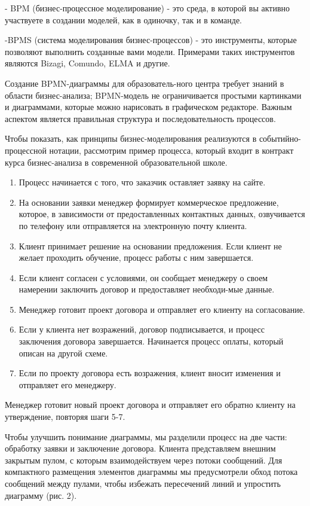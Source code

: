 \begin{multicols}{2}
- BPM (бизнес-процессное моделирование) - это среда, в которой вы
активно участвуете в создании моделей, как в одиночку, так и в команде.

-BPMS (система моделирования бизнес-процессов) - это инструменты,
которые позволяют выполнить созданные вами модели. Примерами таких
инструментов являются Bizagi, Comundo, ELMA и другие.

Создание BPMN-диаграммы для образователь-ного центра требует знаний в
области бизнес-анализа; BPMN-модель не ограничивается простыми
картинками и диаграммами, которые можно нарисовать в графическом
редакторе. Важным аспектом является правильная структура и
последовательность процессов.

Чтобы показать, как принципы бизнес-моделирования реализуются в
событийно-процессной нотации, рассмотрим пример процесса, который входит
в контракт курса бизнес-анализа в современной образовательной школе.

\begin{enumerate}
\def\labelenumi{\arabic{enumi}.}
\setlength{\itemindent}{1cm}
\item
  Процесс начинается с того, что заказчик оставляет заявку на сайте.
\item
  На основании заявки менеджер формирует коммерческое предложение,
  которое, в зависимости от предоставленных контактных данных,
  озвучивается по телефону или отправляется на электронную почту
  клиента.
\item
  Клиент принимает решение на основании предложения. Если клиент не
  желает проходить обучение, процесс работы с ним завершается.
\item
  Если клиент согласен с условиями, он сообщает менеджеру о своем
  намерении заключить договор и предоставляет необходи-мые данные.
\item
  Менеджер готовит проект договора и отправляет его клиенту на
  согласование.
\item
  Если у клиента нет возражений, договор подписывается, и процесс
  заключения договора завершается. Начинается процесс оплаты, который
  описан на другой схеме.
\item
  Если по проекту договора есть возражения, клиент вносит изменения и
  отправляет его менеджеру.
\end{enumerate}

Менеджер готовит новый проект договора и отправляет его обратно клиенту
на утверждение, повторяя шаги 5-7.

Чтобы улучшить понимание диаграммы, мы разделили процесс на две части:
обработку заявки и заключение договора. Клиента представляем внешним
закрытым пулом, с которым взаимодействуем через потоки сообщений. Для
компактного размещения элементов диаграммы мы предусмотрели обход потока
сообщений между пулами, чтобы избежать пересечений линий и упростить
диаграмму (рис. 2).
\end{multicols}

